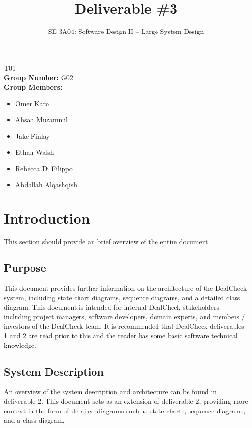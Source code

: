 \documentclass[]{article}
\title{Deliverable \#3}
\author{SE 3A04: Software Design II -- Large System Design}
\date{}
\begin{document}
\maketitle	
{} T01\\
{\bf Group Number:} G02 \\
{\bf Group Members:} 
\begin{itemize}
	\item Omer Karo
	\item Ahsan Muzammil
	\item Jake Finlay
	\item Ethan Walsh
	\item Rebecca Di Filippo
	\item Abdallah Alqashqish
\end{itemize}

\newpage

\section{Introduction}
\label{sec:introduction}

This section should provide an brief overview of the entire document.

\subsection{Purpose}
\label{sub:purpose}
This document provides further information on the architecture of the DealCheck system, including
state chart diagrams, sequence diagrams, and a detailed class diagram.
This document is intended for internal DealCheck stakeholders, including project managers, software developers, domain experts, and members / investors of the DealCheck team. It is recommended that DealCheck deliverables 1 and 2 are read prior to this and the reader has some basic software technical knowledge.

\subsection{System Description}
\label{sub:system_description}
An overview of the system description and architecture can be found in deliverable 2. This document acts as an extension of deliverable 2, providing more context in the form of detailed diagrams such as state charts, sequence diagrams, and a class diagram.
\end{document}
